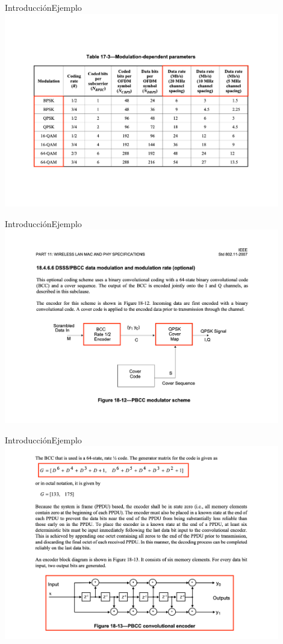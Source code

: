 \documentclass[10pt,compress]{beamer} %
\begin{document}
\begin{frame}{Introducción}{Ejemplo}
  \centering \includegraphics[width=0.9\textwidth]{./Figuras/Wifi3.pdf}
\end{frame}

\begin{frame}{Introducción}{Ejemplo}
  \centering \includegraphics[width=0.9\textwidth]{./Figuras/Wifi4.pdf}
\end{frame}

\begin{frame}{Introducción}{Ejemplo}
  \centering \includegraphics[width=0.9\textwidth]{./Figuras/Wifi5.pdf}
\end{frame}
\end{document}
